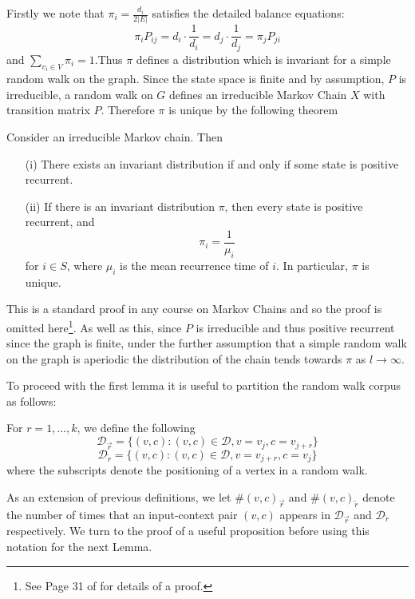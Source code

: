 \documentclass[a4paper]{article}
\newcommand{\D}{\mathcal D}
\newcommand{\rar}{\overrightarrow r}
\newcommand{\lar}{\overleftarrow r}
\begin{document}
Firstly we note that $\pi_i = \frac{d_i}{2|E|}$ satisfies the detailed balance equations:
\[\pi_i P_{ij} = d_i\cdot \frac{1}{d_i} = d_j \cdot \frac{1}{d_j} = \pi_j P_{ji}\]
and $\sum_{v_i \in V} \pi_i = 1$.Thus $\pi$ defines a distribution which is
invariant for a simple random walk on the graph. Since the state space is
finite and by assumption, $P$ is irreducible, a random walk on $G$ defines an
irreducible Markov Chain $X$ with transition matrix $P$. Therefore $\pi$ is
unique by the following theorem
\begin{theorem}
  Consider an irreducible Markov chain. Then
  \begin{itemize}
  \item[(i)] There exists an invariant distribution if and only if some state is
    positive recurrent.
  \item[(ii)] If there is an invariant distribution $\pi$, then every state is
    positive recurrent, and
    \[\pi_i = \frac{1}{\mu_i}\]
    for $i \in S$, where $\mu_i$ is the mean recurrence time of $i$. In
    particular, $\pi$ is unique.
  \end{itemize}
\end{theorem}
This is a standard proof in any course on Markov Chains and so the proof is
omitted here\footnote{See Page 31 of \cite{markov_chains} for details of a proof.}. As
well as this, since $P$ is irreducible and thus positive recurrent since the
graph is finite, under the further assumption that a simple random walk on the
graph is aperiodic the distribution of the chain tends towards $\pi$ as
$l \to \infty$.

To proceed with the first lemma it is useful to partition the random walk corpus as follows:
\begin{definition}
  For $r = 1, \dots, k$, we define the following
  \[\D_{\rar} = \{ (v, c) : (v, c) \in \D, v = v_j, c = v_{j+r}\}\]
  \[\D_{\lar} = \{ (v, c) : (v, c) \in \D, v = v_{j+r}, c = v_{j}\}\]
  where the subscripts denote the positioning of a vertex in a random walk.
\end{definition}
As an extension of previous definitions, we let $\#(v, c)_{\rar}$ and $\#(v,
c)_{\lar}$ denote the number of times that an input-context pair $(v,c)$ appears
in $\D_{\rar}$ and $\D_{\lar}$ respectively. We turn to the proof of a useful proposition before using this
notation for the next Lemma.
\end{document}
